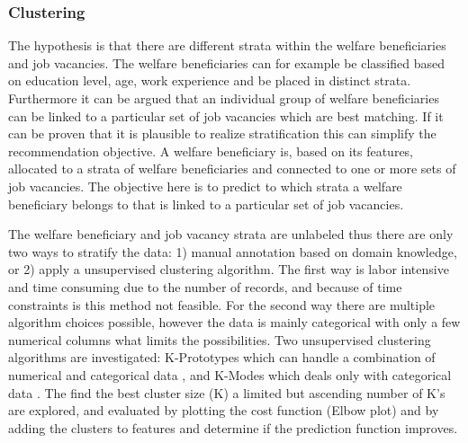 

\subsubsection{Clustering}
The hypothesis is that there are different strata within the welfare beneficiaries and job vacancies. 
The welfare beneficiaries can for example be classified based on education level, age, work experience and be placed in distinct strata.
Furthermore it can be argued that an individual group of welfare beneficiaries can be linked to a particular set of job vacancies which are best matching. 
If it can be proven that it is plausible to realize stratification this can simplify the recommendation objective. 
A welfare beneficiary is, based on its features, allocated to a strata of welfare beneficiaries and connected to one or more sets of job vacancies. 
The objective here is to predict to which strata a welfare beneficiary belongs to that is linked to a particular set of job vacancies. 

The welfare beneficiary and job vacancy strata are unlabeled thus there are only two ways to stratify the data: 1) manual annotation based on domain knowledge, or 2) apply a unsupervised clustering algorithm.
The first way is labor intensive and time consuming due to the number of records, and because of time constraints is this method not feasible. 
For the second way there are multiple algorithm choices possible, however the data is mainly categorical with only a few numerical columns what limits the possibilities. 
Two unsupervised clustering algorithms are investigated: K-Prototypes which can handle a combination of numerical and categorical data \cite{huang1997clustering}, and K-Modes which deals only with categorical data \cite{huang1997clustering, huang1998extensions}.
The find the best cluster size (K) a limited but ascending number of K’s are explored, and evaluated by plotting the cost function (Elbow plot) and by adding the clusters to features and determine if the prediction function improves.

